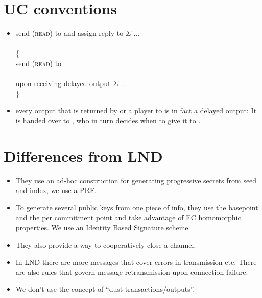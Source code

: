 \section{UC conventions}
  \begin{itemize}
    \item send (\textsc{read}) to \ledger{} and assign reply to $\Sigma$ ... \\
    = \\
    \{ \\
    send (\textsc{read}) to \ledger{} \\ \ \\
    upon receiving delayed output $\Sigma$ ... \\
    \}
    \item every output that is returned by \fpaynet{} or a player to
    \environment{} is in fact a delayed output: It is handed over to
    \adversary{}, who in turn decides when to give it to \environment{}.
  \end{itemize}

\section{Differences from LND}
  \begin{itemize}
    \item They use an ad-hoc construction for generating progressive secrets
    from seed and index, we use a PRF.
    \item To generate several public keys from one piece of info, they use the
    basepoint and the per commitment point and take advantage of EC homomorphic
    properties. We use an Identity Based Signature scheme.
    \item They also provide a way to cooperatively close a channel.
    \item In LND there are more messages that cover errors in transmission etc.
    There are also rules that govern message retransmission upon connection
    failure.
    \item We don't use the concept of ``dust transactions/outputs''.
  \end{itemize}
